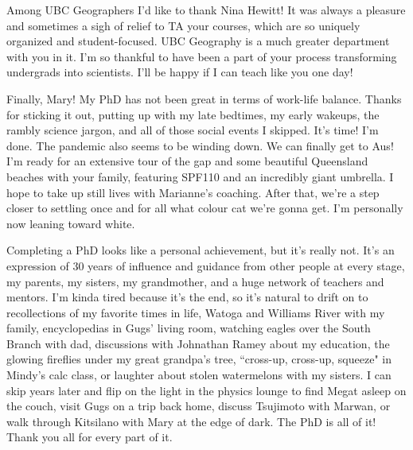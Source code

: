Among UBC Geographers I'd like to thank Nina Hewitt! It was always a pleasure and sometimes a sigh of relief to TA your courses, which are so uniquely organized and student-focused. UBC Geography is a much greater department with you in it. I'm so thankful to have been a part of your process transforming undergrads into scientists. I'll be happy if I can teach like you one day!

Finally, Mary! My PhD has not been great in terms of work-life balance. Thanks for sticking it out, putting up with my late bedtimes, my early wakeups, the rambly science jargon, and all of those social events I skipped. It's time! I'm done. The pandemic also seems to be winding down. We can finally get to Aus! I'm ready for an extensive tour of the gap and some beautiful Queensland beaches with your family, featuring SPF110 and an incredibly giant umbrella. I hope to take up still lives with Marianne's coaching. After that, we're a step closer to settling once and for all what colour cat we're gonna get. I'm personally now leaning toward white.

Completing a PhD looks like a personal achievement, but it's really not.
It's an expression of 30 years of influence and guidance from other people at every stage, my parents, my sisters, my grandmother, and a huge network of teachers and mentors.
I'm kinda tired because it's the end, so it's natural to drift on to recollections of my favorite times in life, Watoga and Williams River with my family, encyclopedias in Gugs' living room, watching eagles over the South Branch with dad, discussions with Johnathan Ramey about my education, the glowing fireflies under my great grandpa's tree, ``cross-up, cross-up, squeeze" in Mindy's calc class, or laughter about stolen watermelons with my sisters. I can skip years later and flip on the light in the physics lounge to find Megat asleep on the couch, visit Gugs on a trip back home, discuss Tsujimoto with Marwan, or walk through Kitsilano with Mary at the edge of dark. The PhD is all of it! Thank you all for every part of it.




